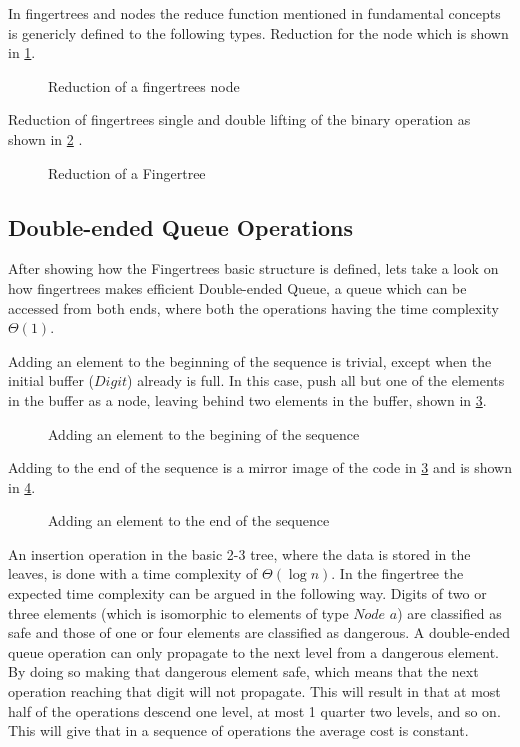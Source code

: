 In fingertrees and nodes the reduce function mentioned in fundamental concepts
is genericly defined to the following types. 
Reduction for the node which is shown in \cref{fig:reductionNode}.

\begin{figure}[h!]

\caption{Reduction of a fingertrees node \label{fig:reductionNode}}
\end{figure}

Reduction of fingertrees single and double lifting of the binary operation as
shown in \cref{fig:reductionFingerTree}
\cite{fingertree}.

\begin{figure}[h!]

\caption{Reduction of a Fingertree \label{fig:reductionFingerTree}}
\end{figure}

\subsection{Double-ended Queue Operations}
After showing how the Fingertrees basic structure is defined, lets take a look
on how fingertrees makes efficient Double-ended Queue, a queue which can be
accessed from both ends, where both the operations having the time complexity
$\Theta(1)$.

Adding an element to the beginning of the sequence is trivial, except
when the initial buffer ($Digit$) already is full. In this case, push all but
one of the elements in the buffer as a node, leaving behind two elements in the
buffer, shown in \cref{fig:AddFirst}.

\begin{figure}[h!]

\caption{Adding an element to the begining of the sequence \label{fig:AddFirst}}
\end{figure}

Adding to the end of the sequence is a mirror image of the code in
\cref{fig:AddFirst} and is shown in \cref{fig:AddLast}.

\begin{figure}[h!]

\caption{Adding an element to the end of the sequence \label{fig:AddLast}}
\end{figure}

An insertion operation in the basic 2-3 tree, where the data is stored in the
leaves, is done with a time complexity of $\Theta (\log n)$. In the fingertree
the expected time complexity can be argued in the following way. Digits of two
or three elements (which is isomorphic to elements of type $Node$ $a$) are
classified as safe and those of one or four elements are classified as dangerous.
A double-ended queue operation can only propagate to the next level from a
dangerous element. By doing so making that dangerous element safe, which means
that the next operation reaching that digit will not propagate. This will result
in that at most half of the operations descend one level, at most 1 quarter two
levels, and so on. This will give that in a sequence of operations the average
cost is constant.

